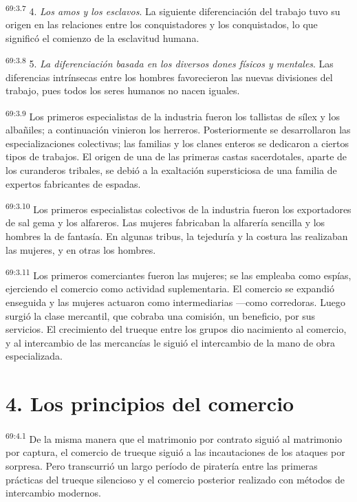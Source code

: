 \documentclass[twoside, 11pt]{book}
\begin{document}
\par
\textsuperscript{69:3.7} 4. \textit{Los amos y los esclavos}. La siguiente diferenciación del trabajo tuvo su origen en las relaciones entre los conquistadores y los conquistados, lo que significó el comienzo de la esclavitud humana.

\par
\textsuperscript{69:3.8} 5. \textit{La diferenciación basada en los diversos dones físicos y mentales}. Las diferencias intrínsecas entre los hombres favorecieron las nuevas divisiones del trabajo, pues todos los seres humanos no nacen iguales.

\par
\textsuperscript{69:3.9} Los primeros especialistas de la industria fueron los tallistas de sílex y los albañiles; a continuación vinieron los herreros. Posteriormente se desarrollaron las especializaciones colectivas; las familias y los clanes enteros se dedicaron a ciertos tipos de trabajos. El origen de una de las primeras castas sacerdotales, aparte de los curanderos tribales, se debió a la exaltación supersticiosa de una familia de expertos fabricantes de espadas.

\par
\textsuperscript{69:3.10} Los primeros especialistas colectivos de la industria fueron los exportadores de sal gema y los alfareros. Las mujeres fabricaban la alfarería sencilla y los hombres la de fantasía. En algunas tribus, la tejeduría y la costura las realizaban las mujeres, y en otras los hombres.

\par
\textsuperscript{69:3.11} Los primeros comerciantes fueron las mujeres; se las empleaba como espías, ejerciendo el comercio como actividad suplementaria. El comercio se expandió enseguida y las mujeres actuaron como intermediarias ---como corredoras. Luego surgió la clase mercantil, que cobraba una comisión, un beneficio, por sus servicios. El crecimiento del trueque entre los grupos dio nacimiento al comercio, y al intercambio de las mercancías le siguió el intercambio de la mano de obra especializada.

\section*{4. Los principios del comercio}
\par
\textsuperscript{69:4.1} De la misma manera que el matrimonio por contrato siguió al matrimonio por captura, el comercio de trueque siguió a las incautaciones de los ataques por sorpresa. Pero transcurrió un largo período de piratería entre las primeras prácticas del trueque silencioso y el comercio posterior realizado con métodos de intercambio modernos.
\end{document}
